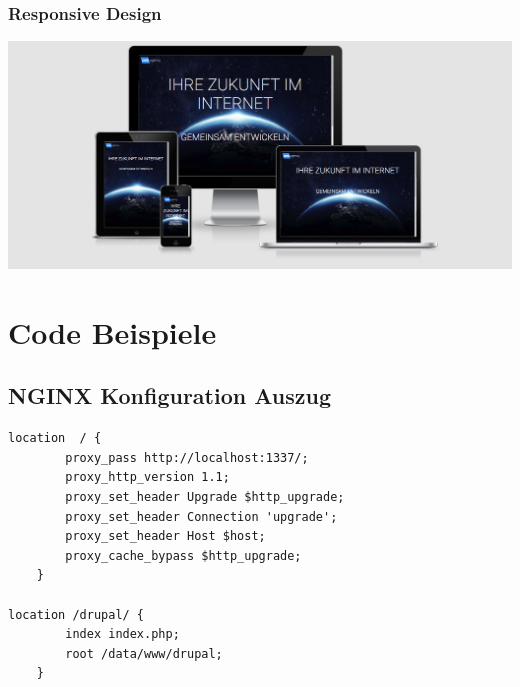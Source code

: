 \documentclass[11pt,a4paper]{article}
\begin{document}
\begin{appendices}
\subsubsection{Responsive Design}
\label{sec:responsive}
\includegraphics[scale=0.3]{responsive}
\section{Code Beispiele}
\subsection{NGINX Konfiguration Auszug}
\label{sec:nginx}
\begin{lstlisting}[frame=single,   basicstyle=\footnotesize]
location  / {
        proxy_pass http://localhost:1337/;
        proxy_http_version 1.1;
        proxy_set_header Upgrade $http_upgrade;
        proxy_set_header Connection 'upgrade';
        proxy_set_header Host $host;
        proxy_cache_bypass $http_upgrade;
    }
    
location /drupal/ {
        index index.php;
        root /data/www/drupal;
    }
    
\end{lstlisting}
\end{appendices}
\end{document}

